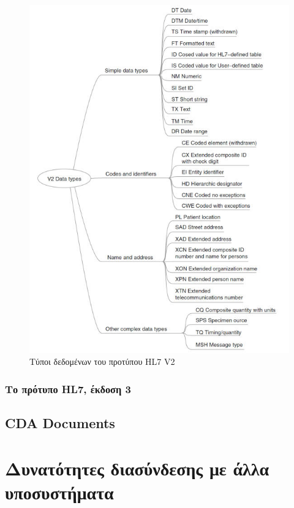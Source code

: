 	\begin{figure}[H]
	    \centering
	    \includegraphics[width=1\textwidth]{HL7_V2_data_types.jpg}
	    \caption{Τύποι δεδομένων του προτύπου HL7 V2}
	    \label{fig:HL7_V2_data_types}
	\end{figure}
			
		\subsubsection{Το πρότυπο HL7, έκδοση 3}
	\subsection{CDA Documents}
	

		
\section{Δυνατότητες διασύνδεσης με άλλα υποσυστήματα}

